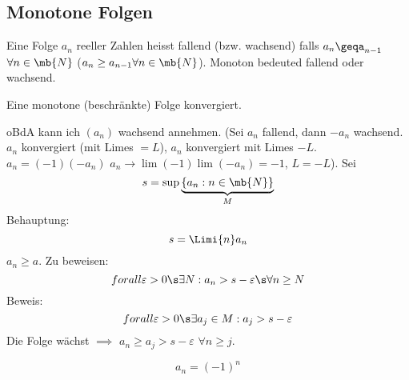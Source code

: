 \subsection{Monotone Folgen}
\begin{Def}
  Eine Folge $a_n$ reeller Zahlen heisst fallend (bzw. wachsend) falls $a_n\geqa_{n-1}$ $\forall n\in\mb{N}$ ($a_n\geq a_{n-1}\forall n\in\mb{N}$). Monoton bedeuted fallend oder wachsend.
\end{Def}
\begin{Sat}
  Eine monotone (beschränkte) Folge konvergiert.
\end{Sat}
\begin{Bew}
  oBdA kann ich $(a_n)$ wachsend annehmen. (Sei $a_n$ fallend, dann $-a_n$ wachsend. $a_n$ konvergiert (mit Limes $=L$), $a_n$ konvergiert mit Limes $-L$. $a_n=(-1)(-a_n)$ $a_n\to \lim(-1)\lim(-a_n)=-1$, $L=-L$). Sei 
  \[s=\sup \underbrace{\left\{ a_n:n\in\mb{N} \right\}}_M\]
  Behauptung:
  \[s=\Limi{n} a_n\]
  $a_n\geq a$. Zu beweisen:
  \[forall \varepsilon>0\s\exists N: a_n> s-\varepsilon\s\forall n\geq N\]
  Beweis:
  \[forall \varepsilon>0\s\exists a_j\in M:a_j>s-\varepsilon\]
  Die Folge wächst $\implies$ $a_n\geq a_j>s-\varepsilon$ $\forall n\geq j$.
\end{Bew}
\begin{Bsp}
  \[a_n=(-1)^n\]
\end{Bsp}
